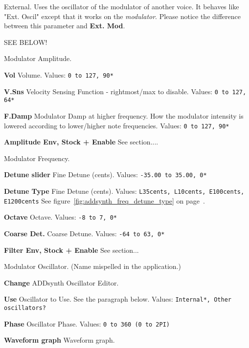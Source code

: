    External. Uses the oscillator  of the modulator of another voice. It
   behaves like "Ext. Oscil" except that it works on the
   \textsl{modulator}. Please
   notice the difference between this parameter and \textbf{Ext. Mod}. 

   SEE BELOW!

   Modulator Amplitude.

   \begin{enumber}
      \item \textbf{Vol}
         Volume.
         Values: \texttt{0 to 127, 90*}
      \item \textbf{V.Sns}
         Velocity Sensing Function - rightmost/max to disable.
         Values: \texttt{0 to 127, 64*}
      \item \textbf{F.Damp}
         Modulator Damp at higher frequency.
         How the modulator intensity is lowered according to lower/higher
         note frequencies. 
         Values: \texttt{0 to 127, 90*}
      \item \textbf{Amplitude Env, Stock + Enable}
         See section....
   \end{enumber}

   Modulator Frequency.

   \begin{enumber}
      \item \textbf{Detune slider}
         Fine Detune (cents).
         Values: \texttt{-35.00 to 35.00, 0*}
      \item \textbf{Detune Type}
         Fine Detune (cents).
         Values: \texttt{L35cents, L10cents, E100cents, E1200cents}
         See figure~\ref{fig:addsynth_freq_detune_type} on
         page~\pageref{fig:addsynth_freq_detune_type}.
      \item \textbf{Octave}
         Octave.
         Values: \texttt{-8 to 7, 0*}
      \item \textbf{Coarse Det.}
         Coarse Detune.
         Values: \texttt{-64 to 63, 0*}
      \item \textbf{Filter Env, Stock + Enable}
         See section...
   \end{enumber}

   Modulator Oscillator.  (Name mispelled in the application.)

   \begin{enumber}
      \item \textbf{Change}
         ADDsynth Oscillator Editor.
      \item \textbf{Use}
         Oscillator to Use.
         See the paragraph below.
         Values: \texttt{Internal*, Other oscillators?}
      \item \textbf{Phase}
         Oscillator Phase.
         Values: \texttt{0 to 360 (0 to 2PI)}
      \item \textbf{Waveform graph}
         Waveform graph.
   \end{enumber}

